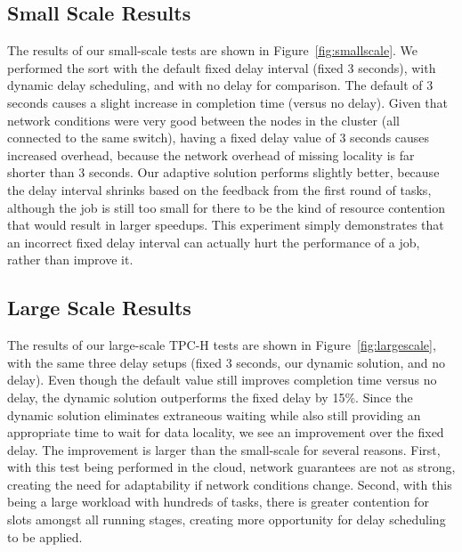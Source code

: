 \subsection{Small Scale Results}
 The results of our small-scale tests are shown in Figure~\ref{fig:smallscale}.
We performed the sort with the default fixed delay interval (fixed 3 seconds),
with dynamic delay scheduling, and with no delay for comparison. The default of
3 seconds causes a slight increase in completion time (versus no delay). Given
that network conditions were very good between the nodes in the cluster (all
connected to the same switch), having a fixed delay value of 3 seconds causes
increased overhead, because the network overhead of missing locality is far
shorter than 3 seconds. Our adaptive solution performs slightly better, because
the delay interval shrinks based on the feedback from the first round of tasks,
although the job is still too small for there to be the kind of resource
contention that would result in larger speedups. This experiment simply
demonstrates that an incorrect fixed delay interval can actually hurt the
performance of a job, rather than improve it.

\subsection{Large Scale Results}

The results of our large-scale TPC-H tests are shown in Figure~\ref{fig:largescale}, with the same three 
delay setups (fixed 3 seconds, our dynamic solution, and no delay). Even though the default
value still improves completion time versus no delay, the dynamic solution outperforms 
the fixed delay by 15\%. Since the dynamic solution eliminates extraneous
waiting while also still providing an appropriate time to wait for data locality, we see
an improvement over the fixed delay. The improvement is larger than the small-scale for
several reasons. First, with this test being performed in the cloud, network guarantees
are not as strong, creating the need for adaptability if network conditions change. 
Second, with this being a large workload with hundreds of tasks, there is greater 
contention for slots amongst all running stages, creating more opportunity for delay 
scheduling to be applied.

